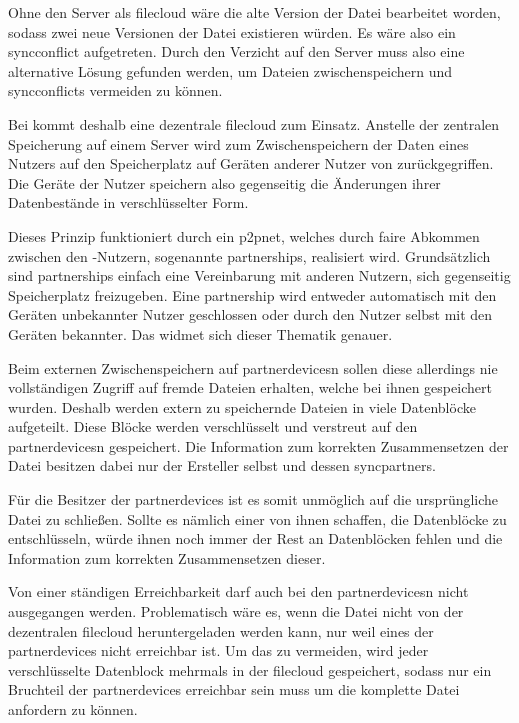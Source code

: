 Ohne den Server als \gls{filecloud} wäre die alte Version der Datei bearbeitet worden, sodass zwei
neue Versionen der Datei existieren würden. Es wäre also ein \gls{syncconflict} aufgetreten.
Durch den Verzicht auf den Server muss also eine alternative Lösung gefunden werden,
um Dateien zwischenspeichern und \glspl{syncconflict} vermeiden zu können.

Bei \sblit kommt deshalb eine dezentrale \gls{filecloud} zum Einsatz. Anstelle
der zentralen Speicherung auf einem Server wird zum Zwischenspeichern der Daten eines
Nutzers auf den Speicherplatz auf Geräten anderer Nutzer von \sblit zurückgegriffen.
Die Geräte der Nutzer speichern also gegenseitig die Änderungen ihrer Datenbestände
in verschlüsselter Form.

Dieses Prinzip funktioniert durch ein \gls{p2pnet}, welches durch faire Abkommen zwischen den \sblit-Nutzern,
sogenannte \glspl{partnership}, realisiert wird. Grundsätzlich sind \glspl{partnership} einfach eine
Vereinbarung mit anderen Nutzern, sich gegenseitig Speicherplatz freizugeben.
Eine \gls{partnership} wird entweder automatisch mit den Geräten unbekannter Nutzer
geschlossen oder durch den Nutzer selbst mit den Geräten bekannter.
Das  widmet sich dieser Thematik genauer.

Beim externen Zwischenspeichern auf \glspl{partnerdevice}n sollen diese allerdings
nie vollständigen Zugriff auf fremde Dateien erhalten, welche bei ihnen gespeichert
wurden. Deshalb werden extern zu speichernde Dateien in viele Datenblöcke aufgeteilt.
Diese Blöcke werden verschlüsselt und verstreut auf den \glspl{partnerdevice}n gespeichert.
Die Information zum korrekten Zusammensetzen der Datei besitzen dabei nur der Ersteller selbst und dessen
\glspl{syncpartner}.

Für die Besitzer der \glspl{partnerdevice} ist es somit unmöglich auf die ursprüngliche
Datei zu schließen. Sollte es nämlich einer von ihnen schaffen, die Datenblöcke zu
entschlüsseln, würde ihnen noch immer der Rest an Datenblöcken fehlen und die Information
zum korrekten Zusammensetzen dieser.

Von einer ständigen Erreichbarkeit darf auch bei den \glspl{partnerdevice}n nicht
ausgegangen werden. Problematisch wäre es, wenn die Datei nicht von der dezentralen
\gls{filecloud} heruntergeladen werden kann, nur weil eines der \glspl{partnerdevice}
nicht erreichbar ist. Um das zu vermeiden, wird jeder verschlüsselte Datenblock mehrmals
 in der \gls{filecloud} gespeichert, sodass nur ein Bruchteil der
\glspl{partnerdevice} erreichbar sein muss um die komplette Datei anfordern zu können.

